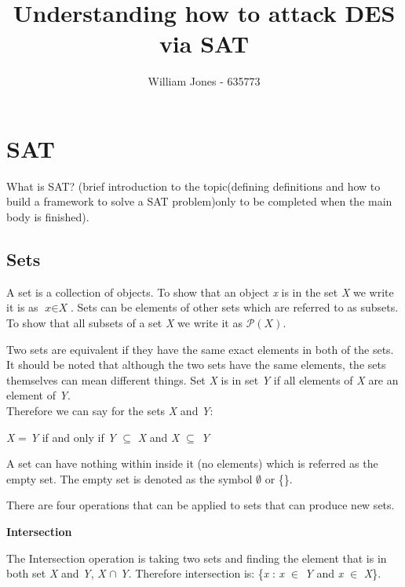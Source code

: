 \documentclass[11pt,a4paper]{article}
\author{William Jones - 635773}
\begin{document}
\title{Understanding how to attack DES via SAT}
\maketitle
\thispagestyle{empty}
\setcounter{page}{1}
\newpage
\tableofcontents
\clearpage


\section{SAT}
What is SAT? (brief introduction to the topic(defining definitions and how to build a framework to solve a SAT problem)only to be completed when the main body is finished).
\newline

\subsection{Sets}
A set is a collection of objects. To show that an object \textit{x} is in the set \textit{X} we write it is as $\textit{x} \in \textit{X}$. Sets can be elements of other sets which are referred to as subsets. To show that all subsets of a set \textit{X} we write it as $\mathcal{P}(\textit{X})$. 
\newline

\noindent Two sets are equivalent if they have the same exact elements in both of the sets. It should be noted that although the two sets have the same elements, the sets themselves can mean different things. Set \textit{X} is in set \textit{Y} if all elements of \textit{X} are an element of \textit{Y}.\\
Therefore we can say for the sets \textit{X} and \textit{Y}:

\begin{center}
{\textit{X} = \textit{Y} if and only if \textit{Y} $\subseteq$ \textit{X} and \textit{X} $\subseteq$ \textit{Y}}
\end{center}

\noindent A set can have nothing within inside it (no elements) which is referred as the empty set. The empty set is denoted as the symbol $\emptyset$ or \{\}.
\newline

\noindent There are four operations that can be applied to sets that can produce new sets. \newline \newline

\textbf{Intersection} 

\indent The Intersection operation is taking two sets and finding the element that is in both set \textit{X} and \textit{Y}, \textit{X} $\cap$ \textit{Y}. Therefore intersection is: \{\textit{x} : \textit{x} $\in$ \textit{Y} and \textit{x} $\in$ \textit{X}\}. \newline
\end{document}
